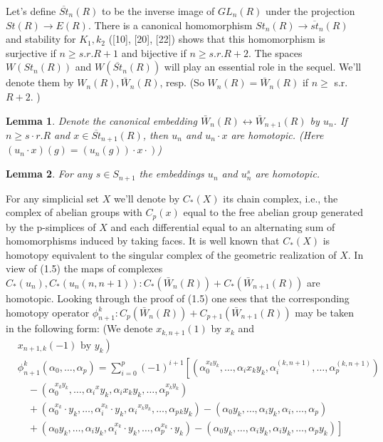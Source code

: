 \documentclass{book}
\newtheorem{lemm}{Lemma}
\begin{document}
Let's define $\overline{S t}_n(R)$ to be the inverse image of $G L_n(R)$ under the projection $S t(R) \rightarrow E(R)$. There is a canonical homomorphism $S t_n(R) \rightarrow \overline{s t}_n(R)$ and stability for $K_1, k_2$ ([10], [20], [22]) shows that this homomorphism is surjective if $n \geq s . r . R+1$ and bijective if $n \geq s . r . R+2$. The spaces $W\left(S t_n(R)\right)$ and $W\left(\overline{S t}_n(R)\right)$ will play an essential role in the sequel. We'll denote them by $W_n(R), \bar{W}_n(R)$, resp. (So $W_n(R)=\bar{W}_n(R)$ if $n \geq$ s.r. $R+2$. )

\begin{lemm}
Denote the canonical embedding $\bar{W}_n(R) \longleftrightarrow \bar{W}_{n+1}(R)$ by $u_n$. If $n \geq s \cdot r . R$ and $x \in \overline{S t}_{n+1}(R)$, then $u_n$ and $u_n \cdot x$ are homotopic. (Here $\left.\left(u_n \cdot x\right)(g)=\left(u_n(g)\right) \cdot x \cdot\right)$)
\end{lemm}

\begin{lemm}
For any $s \in S_{n+1}$ the embeddings $u_n$ and $u_n^s$ are homotopic.   
\end{lemm}


For any simplicial set $X$ we'll denote by $C_*(X)$ its chain complex, i.e., the complex of abelian groups with $C_p(x)$ equal to the free abelian group generated by the p-simplices of $X$ and each differential equal to an alternating sum of homomorphisms induced by taking faces. It is well known that $C_*(X)$ is homotopy equivalent to the singular complex of the geometric realization of $X$. In view of (1.5) the maps of complexes $C_*\left(u_n\right), C_*\left(u_n(n, n+1)\right): C_*\left(\bar{W}_n(R)\right)+C_*\left(\bar{W}_{n+1}(R)\right)$ are homotopic. Looking through the proof of (1.5) one sees that the corresponding homotopy operator $\phi_{n+1}^k: C_p\left(\bar{W}_n(R)\right)+C_{p+1}\left(\bar{W}_{n+1}(R)\right)$ may be taken in the following form: (We denote $x_{k, n+1}(1)$ by $x_k$ and
$$
\begin{aligned}
& \left.x_{n+1, k}(-1) \text { by } y_k\right) \\
& \phi_{n+1}^k\left(\alpha_0, \ldots, \alpha_p\right)=\sum_{i=0}^p(-1)^{i+1}\left[\left(\alpha_0^{x_k y_k}, \ldots, \alpha_i x_k y_k, \alpha_i^{(k, n+1)}, \ldots, \alpha_p^{(k, n+1)}\right)\right. \\
& \quad-\left(\alpha_0^{x_k y_k}, \ldots, \alpha_i{ }^x y_k, \alpha_i x_k y_k, \ldots, \alpha_p^{x_k y_k}\right) \\
& \quad+\left(\alpha_0^{x_k} \cdot y_k, \ldots, \alpha_i^{x_k} \cdot y_k, \alpha_i{ }^{x_k y_k}, \ldots, \alpha_p{ }_k y_k\right)-\left(\alpha_0 y_k, \ldots, \alpha_i y_k, \alpha_i, \ldots, \alpha_p\right) \\
& \left.\quad+\left(\alpha_0 y_k, \ldots, \alpha_i y_k, \alpha_i^{x_k} \cdot y_k, \ldots, \alpha_p^{x_k} \cdot y_k\right)-\left(\alpha_0 y_k, \ldots, \alpha_i y_k, \alpha_i y_k, \ldots, \alpha_p y_k\right)\right]
\end{aligned}
$$
\end{document}
